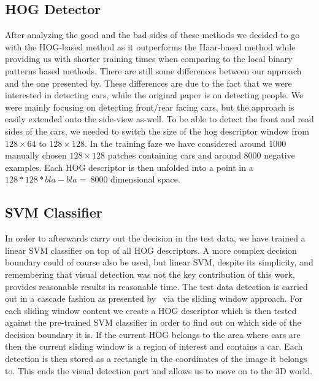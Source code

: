     \subsection{HOG Detector}\label{sub:hog_detector}
        After analyzing the good and the bad sides of these methods we decided to go with the HOG-based method as it outperforms the Haar-based method while providing us with shorter training times when comparing to the local binary patterns based methods.
        There are still some differences between our approach and the one presented by\cite{dalal2005}. These differences are due to the fact that we were interested in detecting cars, while the original paper is on detecting people.
        We were mainly focusing on detecting front/rear facing cars, but the approach is easily extended onto the side-view as-well.
        To be able to detect the front and read sides of the cars, we needed to switch the size of the hog descriptor window from $128 \times 64$ to $128 \times 128$.
        In the training faze we have considered around 1000 manually chosen $128 \times 128$ patches containing cars and around 8000 negative examples. Each HOG descriptor is then unfolded into a point in a $128 * 128 * bla-bla = ~8000$  dimensional space.

    \subsection{SVM Classifier}\label{sub:svm_classifier}
        In order to afterwards carry out the decision in the test data, we have trained a linear SVM classifier on top of all HOG descriptors.
        A more complex decision boundary could of course also be used, but linear SVM, despite its simplicity, and remembering that visual detection was not the key contribution of this work, provides reasonable results in reasonable time.
        The test data detection is carried out in a cascade fashion as presented by~\cite{violajones2001} via the sliding window approach. For each sliding window content we create a HOG descriptor which is then tested against the pre-trained SVM classifier in order to find out on which side of the decision boundary it is. If the current HOG belongs to the area where cars are then the current sliding window is a region of interest and contains a car.
        Each detection is then stored as a rectangle in the coordinates of the image it belongs to.
        This ends the visual detection part and allows us to move on to the 3D world.

